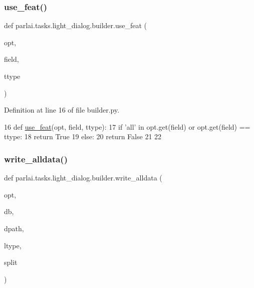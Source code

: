 \subsubsection{\texorpdfstring{use\+\_\+feat()}{use\_feat()}}
{\footnotesize\ttfamily def parlai.\+tasks.\+light\+\_\+dialog.\+builder.\+use\+\_\+feat (\begin{DoxyParamCaption}\item[{}]{opt,  }\item[{}]{field,  }\item[{}]{ttype }\end{DoxyParamCaption})}



Definition at line 16 of file builder.\+py.


\begin{DoxyCode}
16 \textcolor{keyword}{def }\hyperlink{namespaceparlai_1_1tasks_1_1light__dialog_1_1builder_ad9de2827ebcf8386662e48c7fe011e43}{use\_feat}(opt, field, ttype):
17     \textcolor{keywordflow}{if} \textcolor{stringliteral}{'all'} \textcolor{keywordflow}{in} opt.get(field) \textcolor{keywordflow}{or} opt.get(field) == ttype:
18         \textcolor{keywordflow}{return} \textcolor{keyword}{True}
19     \textcolor{keywordflow}{else}:
20         \textcolor{keywordflow}{return} \textcolor{keyword}{False}
21 
22 
\end{DoxyCode}
\mbox{\label{namespaceparlai_1_1tasks_1_1light__dialog_1_1builder_aeb144d0ebd2fd1727f73677e36f2c8b5}} 
\subsubsection{\texorpdfstring{write\+\_\+alldata()}{write\_alldata()}}
{\footnotesize\ttfamily def parlai.\+tasks.\+light\+\_\+dialog.\+builder.\+write\+\_\+alldata (\begin{DoxyParamCaption}\item[{}]{opt,  }\item[{}]{db,  }\item[{}]{dpath,  }\item[{}]{ltype,  }\item[{}]{split }\end{DoxyParamCaption})}



